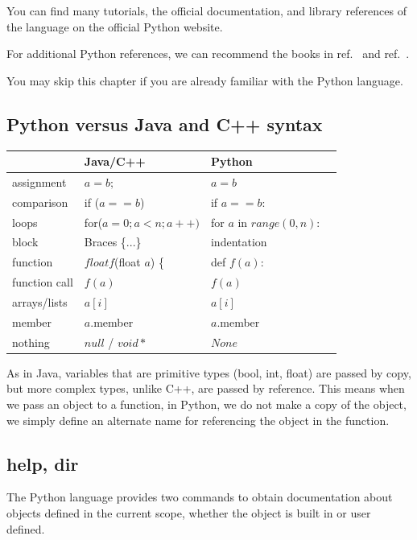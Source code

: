 \documentclass[justified, sixbynine]{tufte-book}
\theoremstyle{plain}%
\newtheorem * {corollary}{Corollary}
\theoremstyle{definition}
\theoremstyle{remark}
\newtheorem * {remark}{Remark}
\newtheorem * {note}{Note}
\begin{document}
\begin{fullwidth}
You can find many tutorials, the official documentation, and library references of the language on the official Python website.~\cite{python}

For additional Python references, we can recommend the books in ref.~\cite{guido}  and ref.~\cite{lutz}.

You may skip this chapter if you are already familiar with the Python language.

\goodbreak\subsection{Python versus Java and C++ syntax}


\begin{center}
\begin{tabular}{|l|l|l|l|}
\hline
& {\bf Java/C++} & {\bf Python} \\ \hline
assignment & $a=b;$ & $a=b$ \\ \hline
comparison & if ($a == b$) & if $a == b$: \\ \hline
loops & for($a=0;a<n;a++)$ & for $a$ in $range(0, n)$: \\ \hline
block & Braces \{...\} & indentation \\ \hline
function & $float f$(float $a$) \{ & def $f(a)$: \\ \hline
function call & $f(a)$ & $f(a)$ \\ \hline
arrays/lists & $a[i]$ & $a[i]$ \\ \hline
member & $a$.member & $a$.member \\ \hline
nothing & $null$ / $void * $ & $None$ \\ \hline
\end{tabular}
\end{center}

As in Java, variables that are primitive types (bool, int, float) are passed by copy, but more complex types, unlike C++, are passed by reference. This means when we pass an object to a function, in Python, we do not make a copy of the object, we simply define an alternate name for referencing the object in the function.

\goodbreak\subsection{help, dir}

 

The Python language provides two commands to obtain documentation about objects defined in the current scope, whether the object is built in or user defined.


\end{fullwidth}
\end{document}

